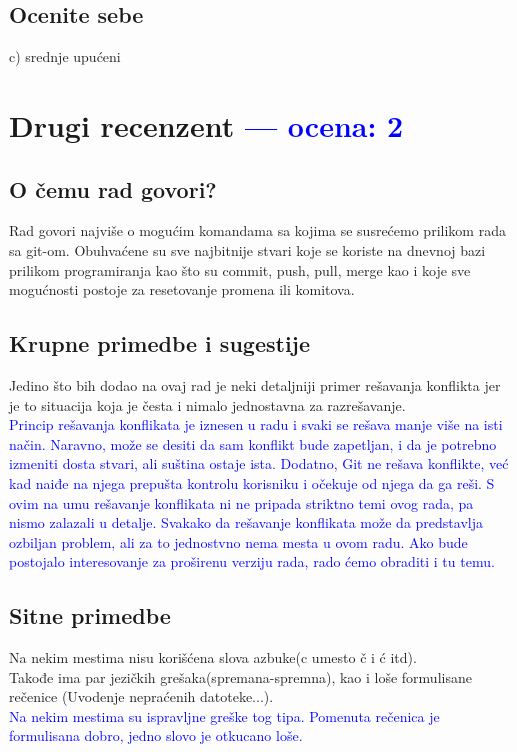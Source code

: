 \documentclass[a4paper]{report}
\newcommand{\odgovor}[1]{\textcolor{blue}{#1}}
\begin{document}
\section{Ocenite sebe}
 c) srednje upućeni



\chapter{Drugi recenzent \odgovor{--- ocena: 2} }

\section{O čemu rad govori?}
Rad govori najviše o mogućim komandama sa kojima se susrećemo prilikom rada sa git-om. Obuhvaćene su sve najbitnije stvari koje se koriste na dnevnoj bazi prilikom programiranja kao što su commit, push, pull, merge kao i koje sve mogućnosti postoje za resetovanje promena ili komitova. 
\section{Krupne primedbe i sugestije}
Jedino što bih dodao na ovaj rad je neki detaljniji primer rešavanja konflikta jer je to situacija koja je česta i nimalo jednostavna za razrešavanje.\\
\odgovor{Princip rešavanja konflikata je iznesen u radu i svaki se rešava manje više na isti način. Naravno, može se desiti da sam konflikt bude zapetljan, i da je potrebno izmeniti dosta stvari, ali suština ostaje ista. Dodatno, Git ne rešava konflikte, već kad naiđe na njega prepušta kontrolu korisniku i očekuje od njega da ga reši. S ovim na umu rešavanje konflikata ni ne pripada striktno temi ovog rada, pa nismo zalazali u detalje. Svakako da rešavanje konflikata može da predstavlja ozbiljan problem, ali za to jednostvno nema mesta u ovom radu. Ako bude postojalo interesovanje za proširenu verziju rada, rado ćemo obraditi i tu temu.}
\section{Sitne primedbe}
Na nekim mestima nisu korišćena slova azbuke(c umesto č i ć itd). \\
Takođe ima par jezičkih grešaka(spremana-spremna), kao i loše formulisane rečenice (Uvodenje nepraćenih datoteke...). \\
\odgovor{Na nekim mestima su ispravljne greške tog tipa. Pomenuta rečenica je formulisana dobro, jedno slovo je otkucano loše.}\\
\end{document}
